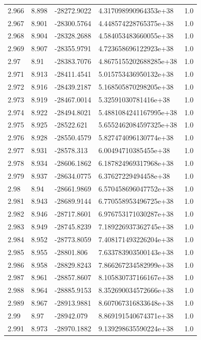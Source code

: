 \begin{tabular}{lllll}
2.966 & 8.898 & -28272.9022 & 4.317098990964353e+38 & 1.0 \\
2.967 & 8.901 & -28300.5764 & 4.448574228765375e+38 & 1.0 \\
2.968 & 8.904 & -28328.2688 & 4.584053483660055e+38 & 1.0 \\
2.969 & 8.907 & -28355.9791 & 4.723658696122923e+38 & 1.0 \\
2.97 & 8.91 & -28383.7076 & 4.8675155202688285e+38 & 1.0 \\
2.971 & 8.913 & -28411.4541 & 5.015753436950132e+38 & 1.0 \\
2.972 & 8.916 & -28439.2187 & 5.168505870298205e+38 & 1.0 \\
2.973 & 8.919 & -28467.0014 & 5.32591030781416e+38 & 1.0 \\
2.974 & 8.922 & -28494.8021 & 5.4881084241167995e+38 & 1.0 \\
2.975 & 8.925 & -28522.621 & 5.6552462084597325e+38 & 1.0 \\
2.976 & 8.928 & -28550.4579 & 5.827474096130774e+38 & 1.0 \\
2.977 & 8.931 & -28578.313 & 6.00494710385455e+38 & 1.0 \\
2.978 & 8.934 & -28606.1862 & 6.187824969317968e+38 & 1.0 \\
2.979 & 8.937 & -28634.0775 & 6.37627229494458e+38 & 1.0 \\
2.98 & 8.94 & -28661.9869 & 6.570458696047752e+38 & 1.0 \\
2.981 & 8.943 & -28689.9144 & 6.770558953496725e+38 & 1.0 \\
2.982 & 8.946 & -28717.8601 & 6.976753171030287e+38 & 1.0 \\
2.983 & 8.949 & -28745.8239 & 7.189226937362745e+38 & 1.0 \\
2.984 & 8.952 & -28773.8059 & 7.408171493226204e+38 & 1.0 \\
2.985 & 8.955 & -28801.806 & 7.633783903500143e+38 & 1.0 \\
2.986 & 8.958 & -28829.8243 & 7.866267234582999e+38 & 1.0 \\
2.987 & 8.961 & -28857.8607 & 8.105830737166167e+38 & 1.0 \\
2.988 & 8.964 & -28885.9153 & 8.352690034572666e+38 & 1.0 \\
2.989 & 8.967 & -28913.9881 & 8.607067316833648e+38 & 1.0 \\
2.99 & 8.97 & -28942.079 & 8.869191540674371e+38 & 1.0 \\
2.991 & 8.973 & -28970.1882 & 9.139298635590224e+38 & 1.0 \\

\end{tabular}
